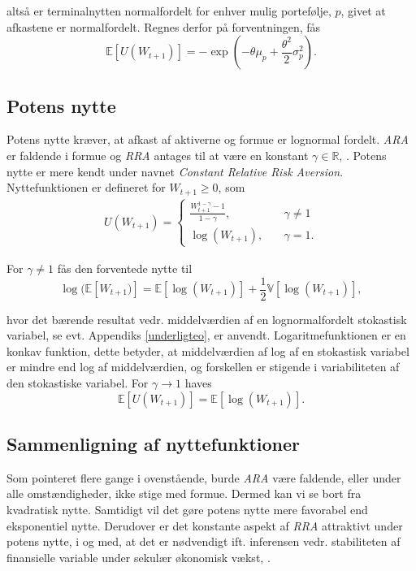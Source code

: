\documentclass[
  a4paper,
  oneside]{memoir}
\begin{document}
altså er terminalnytten normalfordelt for enhver mulig portefølje, \(p\), givet at afkastene er normalfordelt. Regnes derfor på forventningen, fås
\[\mathbb{E}[U(W_{t+1})]=-\exp\left(-\theta\mu_p+\frac{\theta^2}{2}\sigma_p^2\right).\]

\hypertarget{potens-nytte}{%
\subsection{Potens nytte}\label{potens-nytte}}

Potens nytte kræver, at afkast af aktiverne og formue er lognormal fordelt. \emph{ARA} er faldende i formue og \emph{RRA} antages til at være en konstant \(\gamma\in\mathbb{R}\), \citep{CampVic2003}. Potens nytte er mere kendt under navnet \emph{Constant Relative Risk Aversion}. Nyttefunktionen er defineret for \(W_{t+1}\geq 0\), som
\begin{align}
U(W_{t+1})=\begin{cases} \frac{W_{t+1}^{1-\gamma}-1}{1-\gamma},\quad &\gamma\neq 1\\
\log(W_{t+1}),\quad &\gamma = 1. \end{cases} \label{eq:Potnytte}
\end{align}

For \(\gamma\neq 1\) fås den forventede nytte til
\[\log(\mathbb{E}[W_{t+1})]=\mathbb{E}\left[\log(W_{t+1})\right]+\frac{1}{2}\mathbb{V}\left[\log(W_{t+1})\right],\]

hvor det bærende resultat vedr. middelværdien af en lognormalfordelt stokastisk variabel, se evt. Appendiks \ref{underligteo}, er anvendt. Logaritmefunktionen er en konkav funktion, dette betyder, at middelværdien af log af en stokastisk variabel er mindre end log af middelværdien, og forskellen er stigende i variabiliteten af den stokastiske variabel. For \(\gamma \rightarrow 1\) haves
\[\mathbb{E}\left[U(W_{t+1})\right]=\mathbb{E}\left[\log(W_{t+1})\right].\]

\hypertarget{sammenligning-af-nyttefunktioner}{%
\subsection{Sammenligning af nyttefunktioner}\label{sammenligning-af-nyttefunktioner}}

Som pointeret flere gange i ovenstående, burde \emph{ARA} være faldende, eller under alle omstændigheder, ikke stige med formue. Dermed kan vi se bort fra kvadratisk nytte. Samtidigt vil det gøre potens nytte mere favorabel end eksponentiel nytte. Derudover er det konstante aspekt af \emph{RRA} attraktivt under potens nytte, i og med, at det er nødvendigt ift. inferensen vedr. stabiliteten af finansielle variable under sekulær økonomisk vækst, \citep{CampVic2003}.
\end{document}
